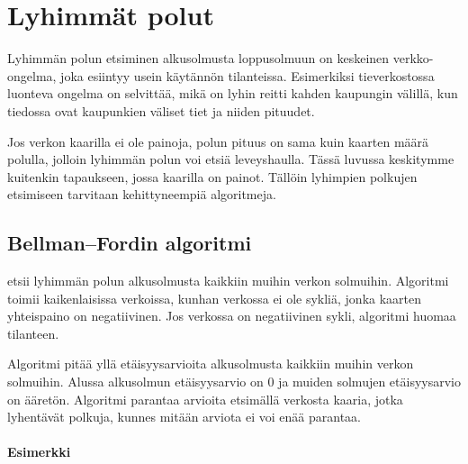 \chapter{Lyhimmät polut}


Lyhimmän polun etsiminen alkusolmusta loppusolmuun
on keskeinen verkko-ongelma, joka esiintyy usein
käytännön tilanteissa.
Esimerkiksi tieverkostossa
luonteva ongelma on selvittää,
mikä on lyhin reitti kahden kaupungin välillä,
kun tiedossa ovat kaupunkien väliset tiet ja niiden pituudet.

Jos verkon kaarilla ei ole painoja,
polun pituus on sama kuin kaarten
määrä polulla, jolloin lyhimmän polun
voi etsiä leveyshaulla.
Tässä luvussa keskitymme kuitenkin
tapaukseen, jossa kaarilla on painot.
Tällöin lyhimpien polkujen etsimiseen
tarvitaan kehittyneempiä algoritmeja.

\section{Bellman–Fordin algoritmi}


 etsii
lyhimmän polun alkusolmusta
kaikkiin muihin verkon solmuihin.
Algoritmi toimii kaikenlaisissa verkoissa,
kunhan verkossa ei ole sykliä,
jonka kaarten yhteispaino on negatiivinen.
Jos verkossa on negatiivinen sykli,
algoritmi huomaa tilanteen.

Algoritmi pitää yllä etäisyysarvioita
alkusolmusta kaikkiin muihin verkon solmuihin.
Alussa alkusolmun etäisyysarvio on 0
ja muiden solmujen etäisyys\-arvio on ääretön.
Algoritmi parantaa arvioita
etsimällä verkosta kaaria,
jotka lyhentävät polkuja,
kunnes mitään arviota ei voi enää parantaa.

\subsubsection{Esimerkki}

